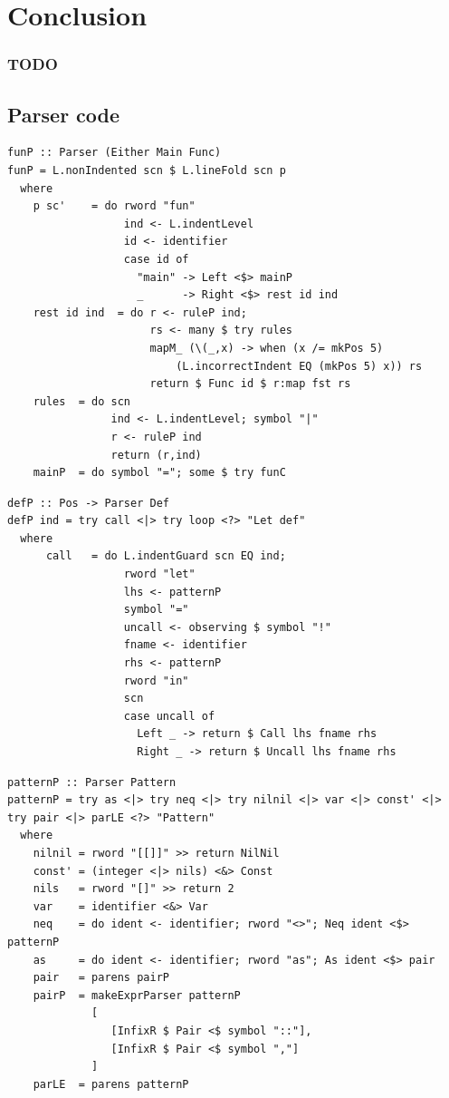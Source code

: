 \documentclass[a4paper]{article}
\begin{document}
\section{Conclusion}
\label{sec:org658455e}
\subsubsection{TODO}
\label{sec:orga3d7b85}



\newpage
\begin{appendix}
\section{Parser code}
\label{sec:org4f2ef7d}
\begin{verbatim}
funP :: Parser (Either Main Func)
funP = L.nonIndented scn $ L.lineFold scn p
  where
    p sc'    = do rword "fun"
                  ind <- L.indentLevel
                  id <- identifier
                  case id of
                    "main" -> Left <$> mainP
                    _      -> Right <$> rest id ind
    rest id ind  = do r <- ruleP ind;
                      rs <- many $ try rules
                      mapM_ (\(_,x) -> when (x /= mkPos 5)
                          (L.incorrectIndent EQ (mkPos 5) x)) rs
                      return $ Func id $ r:map fst rs
    rules  = do scn
                ind <- L.indentLevel; symbol "|"
                r <- ruleP ind
                return (r,ind)
    mainP  = do symbol "="; some $ try funC
\end{verbatim}
\begin{verbatim}
defP :: Pos -> Parser Def
defP ind = try call <|> try loop <?> "Let def"
  where
      call   = do L.indentGuard scn EQ ind;
                  rword "let"
                  lhs <- patternP
                  symbol "="
                  uncall <- observing $ symbol "!"
                  fname <- identifier
                  rhs <- patternP
                  rword "in"
                  scn
                  case uncall of
                    Left _ -> return $ Call lhs fname rhs
                    Right _ -> return $ Uncall lhs fname rhs
\end{verbatim}
\begin{verbatim}
patternP :: Parser Pattern
patternP = try as <|> try neq <|> try nilnil <|> var <|> const' <|> try pair <|> parLE <?> "Pattern"
  where
    nilnil = rword "[[]]" >> return NilNil
    const' = (integer <|> nils) <&> Const
    nils   = rword "[]" >> return 2
    var    = identifier <&> Var
    neq    = do ident <- identifier; rword "<>"; Neq ident <$> patternP
    as     = do ident <- identifier; rword "as"; As ident <$> pair
    pair   = parens pairP
    pairP  = makeExprParser patternP
             [
                [InfixR $ Pair <$ symbol "::"],
                [InfixR $ Pair <$ symbol ","]
             ]
    parLE  = parens patternP
\end{verbatim}
\end{appendix}
\end{document}

